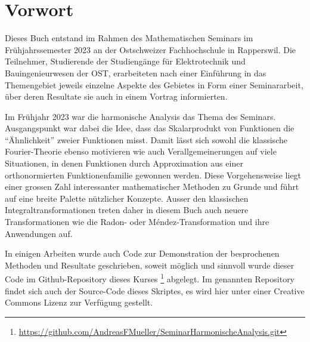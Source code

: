 %
%
%
\chapter*{Vorwort}


Dieses Buch entstand im Rahmen des Mathematischen Seminars
im Frühjahrssemester 2023 an der Ostschweizer Fachhochschule in Rapperswil.
Die Teilnehmer, Studierende der Studiengänge für Elektrotechnik
und Bauingenieurwesen
der OST, erarbeiteten nach einer Einführung in das Themengebiet jeweils
einzelne Aspekte des Gebietes in Form einer Seminararbeit, über
deren Resultate sie auch in einem Vortrag informierten. 

Im Frühjahr 2023 war die harmonische Analysis das Thema des Seminars.
Ausgangspunkt war dabei die Idee, dass das Skalarprodukt von Funktionen
die ``Ähnlichkeit'' zweier Funktionen misst.
Damit lässt sich sowohl die klassische Fourier-Theorie ebenso motivieren
wie auch Verallgemeinerungen auf viele Situationen, in denen Funktionen
durch Approximation aus einer orthonormierten Funktionenfamilie gewonnen
werden.
Diese Vorgehensweise liegt einer grossen Zahl interessanter mathematischer
Methoden zu Grunde und führt auf eine breite Palette nützlicher
Konzepte.
Ausser den klassischen Integraltransformationen treten daher in diesem
Buch auch neuere Transformationen wie die Radon- oder M\'endez-Transformation
und ihre Anwendungen auf.

In einigen Arbeiten wurde auch Code zur Demonstration der 
besprochenen Methoden und Resultate geschrieben, soweit
möglich und sinnvoll wurde dieser Code im Github-Repository
%
dieses Kurses%
\footnote{\url{https://github.com/AndreasFMueller/SeminarHarmonischeAnalysis.git}}
\cite{buch:repo}
abgelegt.
Im genannten Repository findet sich auch der Source-Code dieses
Skriptes, es wird hier unter einer Creative Commons Lizenz
zur Verfügung gestellt.


